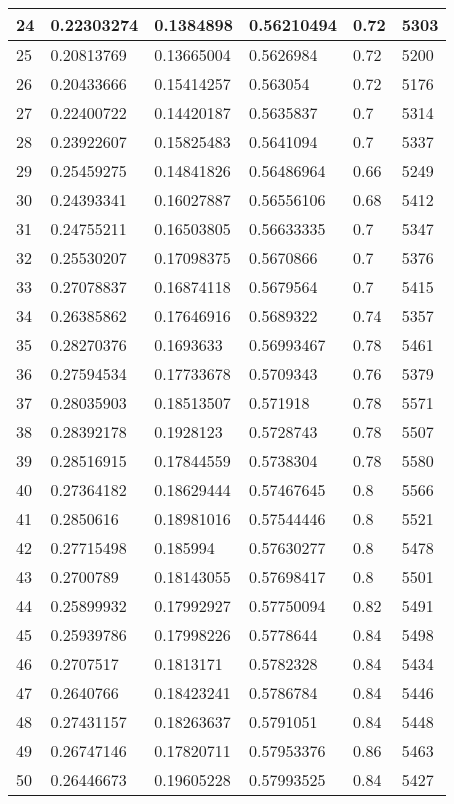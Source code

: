 \begin{longtable}{|l|l|l|l|l|l|}
24 & 0.22303274 & 0.1384898 & 0.56210494 & 0.72 & 5303 \\ \hline 
25 & 0.20813769 & 0.13665004 & 0.5626984 & 0.72 & 5200 \\ \hline 
26 & 0.20433666 & 0.15414257 & 0.563054 & 0.72 & 5176 \\ \hline 
27 & 0.22400722 & 0.14420187 & 0.5635837 & 0.7 & 5314 \\ \hline 
28 & 0.23922607 & 0.15825483 & 0.5641094 & 0.7 & 5337 \\ \hline 
29 & 0.25459275 & 0.14841826 & 0.56486964 & 0.66 & 5249 \\ \hline 
30 & 0.24393341 & 0.16027887 & 0.56556106 & 0.68 & 5412 \\ \hline 
31 & 0.24755211 & 0.16503805 & 0.56633335 & 0.7 & 5347 \\ \hline 
32 & 0.25530207 & 0.17098375 & 0.5670866 & 0.7 & 5376 \\ \hline 
33 & 0.27078837 & 0.16874118 & 0.5679564 & 0.7 & 5415 \\ \hline 
34 & 0.26385862 & 0.17646916 & 0.5689322 & 0.74 & 5357 \\ \hline 
35 & 0.28270376 & 0.1693633 & 0.56993467 & 0.78 & 5461 \\ \hline 
36 & 0.27594534 & 0.17733678 & 0.5709343 & 0.76 & 5379 \\ \hline 
37 & 0.28035903 & 0.18513507 & 0.571918 & 0.78 & 5571 \\ \hline 
38 & 0.28392178 & 0.1928123 & 0.5728743 & 0.78 & 5507 \\ \hline 
39 & 0.28516915 & 0.17844559 & 0.5738304 & 0.78 & 5580 \\ \hline 
40 & 0.27364182 & 0.18629444 & 0.57467645 & 0.8 & 5566 \\ \hline 
41 & 0.2850616 & 0.18981016 & 0.57544446 & 0.8 & 5521 \\ \hline 
42 & 0.27715498 & 0.185994 & 0.57630277 & 0.8 & 5478 \\ \hline 
43 & 0.2700789 & 0.18143055 & 0.57698417 & 0.8 & 5501 \\ \hline 
44 & 0.25899932 & 0.17992927 & 0.57750094 & 0.82 & 5491 \\ \hline 
45 & 0.25939786 & 0.17998226 & 0.5778644 & 0.84 & 5498 \\ \hline 
46 & 0.2707517 & 0.1813171 & 0.5782328 & 0.84 & 5434 \\ \hline 
47 & 0.2640766 & 0.18423241 & 0.5786784 & 0.84 & 5446 \\ \hline 
48 & 0.27431157 & 0.18263637 & 0.5791051 & 0.84 & 5448 \\ \hline 
49 & 0.26747146 & 0.17820711 & 0.57953376 & 0.86 & 5463 \\ \hline 
50 & 0.26446673 & 0.19605228 & 0.57993525 & 0.84 & 5427 \\ \hline 
\end{longtable}